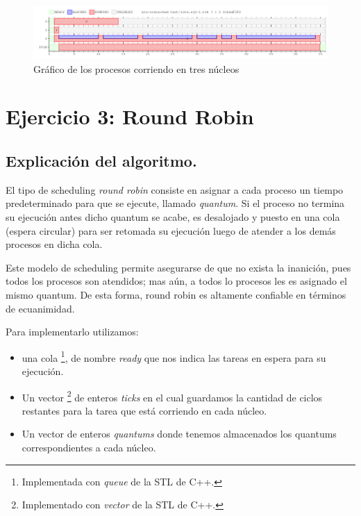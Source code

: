 \documentclass[a4paper]{article}
\begin{document}
\begin{figure}[htb]
\begin{center}
\includegraphics[scale=0.4]{imagenes/ej2-1-c-3.png}
\end{center}
\caption{Gráfico de los procesos corriendo en tres núcleos}
\end{figure}

\newpage

\section{Ejercicio 3: Round Robin}

\subsection{Explicación del algoritmo.}
El tipo de scheduling \textit{round robin} consiste en asignar a cada
proceso un tiempo predeterminado para que se ejecute, llamado
\textit{quantum}. Si el proceso no termina su ejecución antes dicho quantum
se acabe, es desalojado y puesto en una cola (espera circular) para ser
retomada su ejecución luego de atender a los demás procesos en dicha cola.

Este modelo de scheduling permite asegurarse de que no exista la inanición,
pues todos los procesos son atendidos; mas aún, a todos lo
procesos les es asignado el mismo quantum. De esta
forma, round robin es altamente confiable en términos de ecuanimidad.

Para implementarlo utilizamos:
\begin{itemize}
\item una cola \footnote{Implementada con \textit{queue} de la STL de C++.}, de nombre
\textit{ready} que nos indica las tareas en espera para su ejecución.
\item Un vector \footnote{Implementado con
\textit{vector} de la STL de C++.} de enteros \textit{ticks} en el cual
guardamos la cantidad de ciclos restantes para la tarea que está corriendo
en cada núcleo.
\item Un vector de enteros \textit{quantums} donde tenemos
almacenados los quantums correspondientes a cada núcleo. 
\end{itemize}
\end{document}
